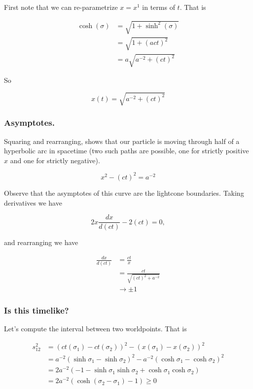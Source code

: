 First note that we can re-parametrize $x = x^1$ in terms of $t$.  That is

\begin{align*}
\cosh(\sigma)
&= \sqrt{1 + \sinh^2(\sigma)}  \\
&= \sqrt{ 1 + (act)^2 }  \\
&= a \sqrt{ a^{-2} + (ct)^2 }
\end{align*}

So

\begin{equation}\label{eqn:relativisticElectrodynamicsT2:20}
x(t) = \sqrt{ a^{-2} + (ct)^2 }
\end{equation}

\subsubsection{Asymptotes.}

Squaring and rearranging, shows that our particle is moving through half of a hyperbolic arc in spacetime (two such paths are possible, one for strictly positive $x$ and one for strictly negative).

\begin{equation}\label{eqn:relativisticElectrodynamicsT2:30}
x^2 - (ct)^2 = a^{-2}
\end{equation}

Observe that the asymptotes of this curve are the lightcone boundaries.  Taking derivatives we have

\begin{equation}\label{eqn:relativisticElectrodynamicsT2:40}
2 x \frac{dx}{d(ct)} -2 (ct) = 0,
\end{equation}

and rearranging we have

\begin{align*}
\frac{dx}{d(ct)}
&= \frac{c t}{x} \\
&= \frac{ct}{\sqrt{(ct)^2 + a^{-2}}} \\
&\rightarrow \pm 1
\end{align*}

\subsubsection{Is this timelike?}

Let's compute the interval between two worldpoints.  That is

\begin{align*}
s_{12}^2
&= (ct(\sigma_1) - ct(\sigma_2))^2 - (x(\sigma_1) - x(\sigma_2))^2  \\
&= a^{-2} (\sinh \sigma_1 - \sinh \sigma_2)^2 - a^{-2} (\cosh\sigma_1 - \cosh\sigma_2)^2 \\
&= 2 a^{-2} \left( -1 - \sinh\sigma_1 \sinh \sigma_2 + \cosh\sigma_1 \cosh\sigma_2 \right) \\
&= 2 a^{-2} \left( \cosh( \sigma_2 - \sigma_1) -1 \right) \ge 0
\end{align*}

